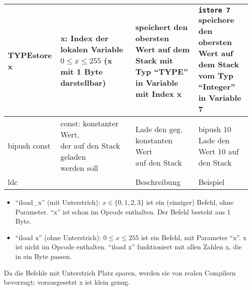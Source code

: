 \begin{table}[H]
\begin{tabular}{l|l|l|l}
		\textbf{TYPE}store x	& \multlineTable{x: Index der lokalen\\ Variable $0 \leq x \leq 255$\\ (x mit 1 Byte darstellbar) }	&	\multlineTable{speichert den obersten Wert auf dem\\ Stack mit Typ \enquote{TYPE} in Variable\\ mit Index x}	& \multlineTable{\texttt{istore 7}\\ speichere den obersten Wert auf\\ dem Stack vom Typ \enquote{Integer}\\ in Variable 7}	\\ \hline	
		
		bipush const& \multlineTable{const: konstanter Wert,\\ der auf den Stack geladen\\ werden soll} & \multlineTable{Lade den geg. konstanten Wert\\ auf den Stack} & \multlineTable{bipush 10\\ Lade den Wert 10 auf den Stack} \\ \hline	
		
		ldc & \open  & Beschreibung & Beispiel \\ \hline
	\end{tabular}
\end{table}


\begin{itemize}
	\item \enquote{iload\_x} (mit Unterstrich): $x \in \{ 0,1,2,3 \}$ ist ein (einziger) Befehl, ohne Parameter. \enquote{x} ist schon im Opcode enthalten. Der Befehl besteht aus 1 Byte.
	\item \enquote{iload x} (ohne Unterstrich): $0 \leq x \leq 255$ ist ein Befehl, mit Parameter \enquote{x}. x ist nicht im Opcode enthalten. \enquote{iload x} funktioniert mit allen Zahlen x, die in ein Byte passen.
\end{itemize}
Da die Befehle mit Unterstrich Platz sparen, werden sie von realen Compilern bevorzugt; vorausgesetzt x ist klein genug.

